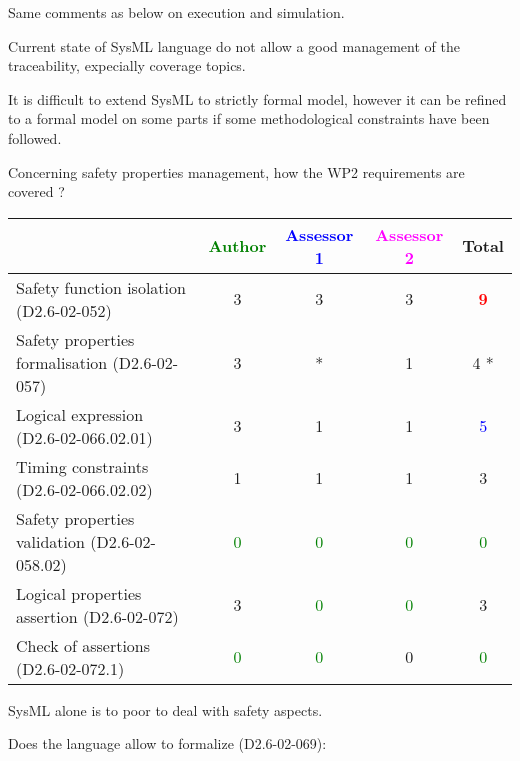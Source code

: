 \begin{assessor2}
Same comments as below on execution and simulation.

Current state of SysML language do not allow a good management of the traceability, expecially coverage topics.

It is difficult to extend SysML to strictly formal model, however it can be refined to a formal model on some parts if some methodological constraints have been followed.
\end{assessor2}

Concerning safety properties management, how the WP2 requirements are covered ?

\begin{tabular}{|l | c | c | c | c|}
\hline
& \textcolor{green}{Author} & \textcolor{blue}{Assessor 1} & \textcolor{magenta}{Assessor 2} & Total \\
\hline
Safety function isolation (D2.6-02-052) & 3    & 3    & 3    & \textcolor{red}{\textbf{9}} \\
\hline
Safety properties formalisation (D2.6-02-057) & 3    & * & 1    & 4   * \\
\hline
Logical expression (D2.6-02-066.02.01) & 3    & 1    & 1    & \textcolor{blue}{5} \\
\hline
Timing constraints (D2.6-02-066.02.02) & 1    & 1    & 1    & 3    \\
\hline
Safety properties validation (D2.6-02-058.02) & \textcolor{green}{0} & \textcolor{green}{0} & \textcolor{green}{0} & \textcolor{green}{0} \\
\hline
Logical properties assertion (D2.6-02-072) & 3    & \textcolor{green}{0} & \textcolor{green}{0} & 3    \\
\hline
Check of assertions (D2.6-02-072.1) & \textcolor{green}{0} & \textcolor{green}{0} &  0 & \textcolor{green}{0} \\
\hline
\end{tabular}




\begin{assessor2}
SysML alone is to  poor to deal with safety aspects.
\end{assessor2}


Does the language allow to formalize (D2.6-02-069):

